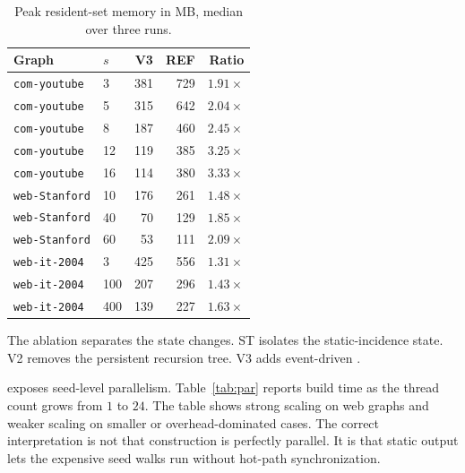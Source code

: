 \begin{table}[t]
\centering
\caption{Peak resident-set memory in MB, median over three runs.}
\label{tab:bd-mem}
\small
\begin{tabular}{llrrr}
\toprule
Graph & \(s\) & V3 & REF & Ratio \\
\midrule
\texttt{com-youtube}  & 3  & 381 & 729 & \(1.91\times\) \\
\texttt{com-youtube}  & 5  & 315 & 642 & \(2.04\times\) \\
\texttt{com-youtube}  & 8  & 187 & 460 & \(2.45\times\) \\
\texttt{com-youtube}  & 12 & 119 & 385 & \(3.25\times\) \\
\texttt{com-youtube}  & 16 & 114 & 380 & \(3.33\times\) \\
\midrule
\texttt{web-Stanford} & 10 & 176 & 261 & \(1.48\times\) \\
\texttt{web-Stanford} & 40 & 70  & 129 & \(1.85\times\) \\
\texttt{web-Stanford} & 60 & 53  & 111 & \(2.09\times\) \\
\midrule
\texttt{web-it-2004}  & 3   & 425 & 556 & \(1.31\times\) \\
\texttt{web-it-2004}  & 100 & 207 & 296 & \(1.43\times\) \\
\texttt{web-it-2004}  & 400 & 139 & 227 & \(1.63\times\) \\
\bottomrule
\end{tabular}
\end{table}

The ablation separates the state changes.
%
ST isolates the static-incidence state.
%
V2 removes the persistent recursion tree.
%
V3 adds event-driven \peelH{}.
%

\paraBuild{} exposes seed-level parallelism.
%
Table~\ref{tab:par} reports build time as the thread count grows from \(1\) to \(24\).
%
The table shows strong scaling on web graphs and weaker scaling on smaller or overhead-dominated cases.
%
The correct interpretation is not that construction is perfectly parallel.
%
It is that static output lets the expensive seed walks run without hot-path synchronization.

